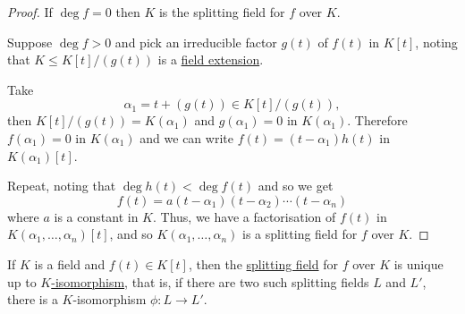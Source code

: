 \documentclass{article}
\begin{document}
\begin{proof}
    If $\deg f = 0$ then $K$ is the splitting field for $f$ over $K$.

    Suppose $\deg f > 0$ and pick an irreducible factor $g(t)$ of $f(t)$ in $K[t]$, noting that $K \leq K[t] / (g(t))$ is a \hyperlink{def:fieldExt}{field extension}.

    Take
    \begin{equation*}\alpha_1 = t + (g(t)) \in K[t]/(g(t)),\end{equation*}
    then $K[t]/(g(t)) = K(\alpha_1)$ and $g(\alpha_1) = 0$ in $K(\alpha_1)$.
    Therefore $f(\alpha_1) = 0$ in $K(\alpha_1)$ and we can write $f(t) = (t-\alpha_1) h(t)$ in $K(\alpha_1)[t]$.

    Repeat, noting that $\deg h(t) < \deg f(t)$ and so we get
    \begin{equation*}f(t) = a(t - \alpha_1)(t - \alpha_2) \dotsm (t-\alpha_n)\end{equation*}
    where $a$ is a constant in $K$.
    Thus, we have a factorisation of $f(t)$ in $K(\alpha_1, \dotsc, \alpha_n)[t]$, and so $K(\alpha_1, \dotsc, \alpha_n)$ is a splitting field for $f$ over $K$.
\end{proof}

\begin{nthm}\label{thm:1.24}
    If $K$ is a field and $f(t) \in K[t]$, then the \hyperlink{def:splitting}{splitting field} for $f$ over $K$ is unique up to \hyperlink{not:hom}{$K$-isomorphism}, that is, if there are two such splitting fields $L$ and $L'$, there is a $K$-isomorphism $\phi: L \to L'$.
\end{nthm}

\end{document}
